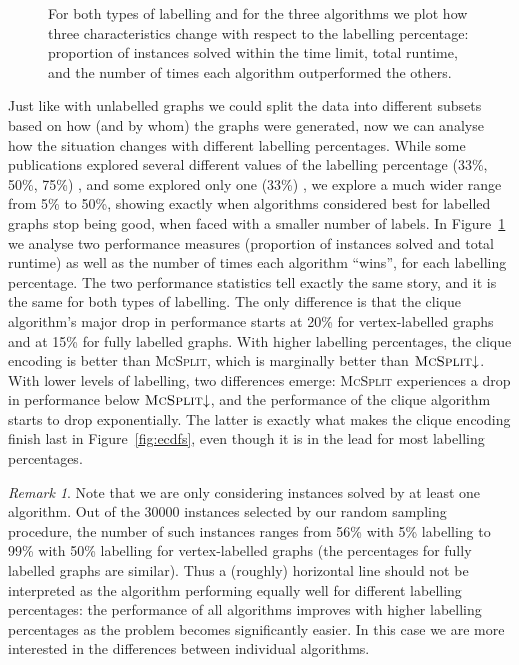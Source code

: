 \documentclass{l4proj}
\theoremstyle{definition}
\theoremstyle{remark}
\newtheorem{remark}{Remark}[chapter]
\begin{document}
\begin{figure}
\begin{subfigure}[t]{0.49\textwidth}
  \end{subfigure}
  \caption{For both types of labelling and for the three algorithms we plot how
    three characteristics change with respect to the labelling percentage:
    proportion of instances solved within the time limit, total runtime, and the
    number of times each algorithm outperformed the others.}
  \label{fig:linecharts}
\end{figure}

Just like with unlabelled graphs we could split the data into different subsets
based on how (and by whom) the graphs were generated, now we can analyse how the
situation changes with different labelling percentages. While some publications
explored several different values of the labelling percentage (33\%, 50\%, 75\%)
\cite{DBLP:conf/sspr/BunkeFGSV02, DBLP:journals/jgaa/ConteFV07,
  DBLP:conf/gbrpr/ConteGS03}, and some explored only one (33\%)
\cite{DBLP:conf/cp/McCreeshNPS16, DBLP:conf/ijcai/McCreeshPT17}, we explore a
much wider range from 5\% to 50\%, showing exactly when algorithms considered
best for labelled graphs stop being good, when faced with a smaller number of
labels. In Figure~\ref{fig:linecharts} we analyse two performance measures
(proportion of instances solved and total runtime) as well as the number of
times each algorithm ``wins'', for each labelling percentage. The two
performance statistics tell exactly the same story, and it is the same for both
types of labelling. The only difference is that the clique algorithm's major
drop in performance starts at 20\% for vertex-labelled graphs and at 15\% for
fully labelled graphs. With higher labelling percentages, the clique encoding is
better than \textsc{McSplit}, which is marginally better than
$\textsc{McSplit}{\downarrow}$. With lower levels of labelling, two differences
emerge: \textsc{McSplit} experiences a drop in performance below
$\textsc{McSplit}{\downarrow}$, and the performance of the clique algorithm
starts to drop exponentially. The latter is exactly what makes the clique
encoding finish last in Figure~\ref{fig:ecdfs}, even though it is in the lead
for most labelling percentages.

\begin{remark}
Note that we are only considering instances solved by at least one algorithm.
Out of the \num{30000} instances selected by our random sampling procedure, the
number of such instances ranges from 56\% with 5\% labelling to 99\% with 50\%
labelling for vertex-labelled graphs (the percentages for fully labelled graphs
are similar). Thus a (roughly) horizontal line should not be interpreted as the
algorithm performing equally well for different labelling percentages: the
performance of all algorithms improves with higher labelling percentages as the
problem becomes significantly easier. In this case we are more interested in the
differences between individual algorithms.
\end{remark}
\end{document}
